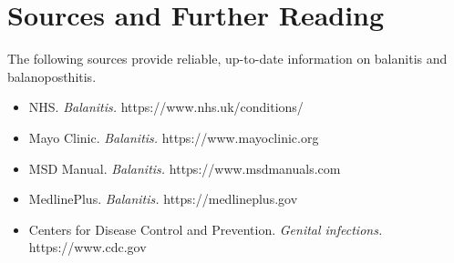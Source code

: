 \section*{Sources and Further Reading}
The following sources provide reliable, up-to-date information on balanitis and balanoposthitis.
\begin{itemize}
    \item NHS. \textit{Balanitis.} https://www.nhs.uk/conditions/
    \item Mayo Clinic. \textit{Balanitis.} https://www.mayoclinic.org
    \item MSD Manual. \textit{Balanitis.} https://www.msdmanuals.com
    \item MedlinePlus. \textit{Balanitis.} https://medlineplus.gov
    \item Centers for Disease Control and Prevention. \textit{Genital infections.} https://www.cdc.gov
\end{itemize}
